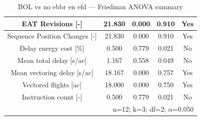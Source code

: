 \begin{table}[htbp]
\caption{BOL vs no ebbr en efd — Friedman ANOVA summary}
\begin{center}
\footnotesize
\setlength{\tabcolsep}{3pt}
\renewcommand{\arraystretch}{1.000}
\begin{tabular}{|c|c|c|c|c|}
\hline
EAT Revisions [-] & 21.830 & 0.000 & 0.910 & Yes \\
\hline
Sequence Position Changes [-] & 21.830 & 0.000 & 0.910 & Yes \\
\hline
Delay energy cost [\%] & 0.500 & 0.779 & 0.021 & No \\
\hline
Mean total delay [s/ac] & 1.167 & 0.558 & 0.049 & No \\
\hline
Mean vectoring delay [s/ac] & 18.167 & 0.000 & 0.757 & Yes \\
\hline
Vectored flights [ac] & 18.000 & 0.000 & 0.750 & Yes \\
\hline
Instruction count [-] & 0.500 & 0.779 & 0.021 & No \\
\hline
\multicolumn{5}{r}{n=12; k=3; df=2; $\alpha$=0.050}\\
\end{tabular}
\label{tab:bol\_vs\_no\_ebbr\_en\_efd\_friedman}
\end{center}
\end{table}